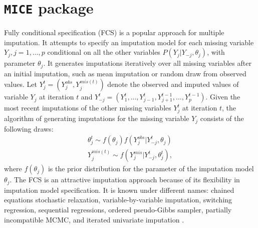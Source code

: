 	\section{\texttt{MICE} package}
	\label{sec:6.3}
	Fully conditional specification (FCS) is a popular approach for multiple imputation. It attempts to specify an imputation model for each missing variable $Y_j, j = 1, \dots, p$ conditional on all the other variables $P(Y_j | Y_{-j}, \theta_{j})$, with parameter $\theta_{j}$. It generates imputations iteratively over all missing variables after an initial imputation, such as mean imputation or random draw from observed values. Let $Y_{j}^{t} = (Y_{j}^{obs}, Y_{j}^{mis(t)})$ denote the observed and imputed values of variable $Y_{j}$ at iteration $t$ and $Y_{-j}^{t} = (Y_{1}^{t}, \dots, Y_{j-1}^{t}, Y_{j+1}^{t-1}, \dots, Y_{p}^{t-1})$. Given the most recent imputations of the other missing variables $Y_{j}^{t}$ at iteration $t$, the algorithm of generating imputations for the missing variable $Y_{j}$ consists of the following draws:
	\begin{align*}
		\theta_{j}^{t} \sim f(\theta_{j})f(Y_{j}^{obs}|Y_{-j}^{t}, \theta_{j})\\
		Y_{j}^{mis(t)} \sim f(Y_{j}^{mis}|Y_{-j}^{t}, \theta_{j}^{t}),
	\end{align*}
	where $f(\theta_{j})$ is the prior distribution for the parameter of the imputation model $\theta_{j}$.
	The FCS is an attractive imputation approach because of its flexibility in imputation model specification. It is known under different names: chained equations stochastic relaxation, variable-by-variable imputation, switching regression, sequential regressions, ordered pseudo-Gibbs sampler, partially incompatible MCMC, and iterated univariate imputation \citep{van2007multiple}. 
	
